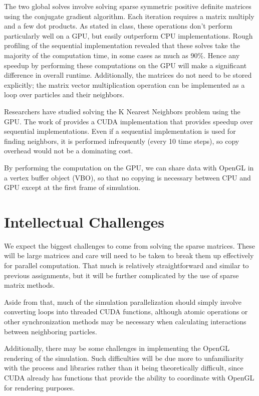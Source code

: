 \documentclass[cameraready]{acmsiggraph-awb}
\begin{document}
The two global solves involve solving sparse symmetric positive definite matrices using the conjugate gradient algorithm.  Each iteration requires a matrix multiply and a few dot products.  As stated in class, these operations don't perform particularly well on a GPU, but easily outperform CPU implementations.  Rough profiling of the sequential implementation revealed that these solves take the majority of the computation time, in some cases as much as 90\%.   Hence any speedup by performing these computations on the GPU will make a significant difference in overall runtime.  Additionally, the matrices do not need to be stored explicitly; the matrix vector multiplication operation can be implemented as a loop over particles and their neighbors.  

Researchers have studied solving the K Nearest Neighbors problem using the GPU.   The work of \cite{Garcia_2008_CVGPU} provides a CUDA implementation that provides speedup over sequential implementations.  Even if a sequential implementation is used for finding neighbors, it is performed infrequently (every 10 time steps), so copy overhead would not be a dominating cost.  

By performing the computation on the GPU, we can share data with OpenGL in a vertex buffer object (VBO), so that no copying is necessary between CPU and GPU except at the first frame of simulation.  


\section{Intellectual Challenges}

We expect the biggest challenges to come from solving the sparse matrices.
These will be large matrices and care will need to be taken to break them up effectively for parallel computation.
That much is relatively straightforward and similar to previous assignments, but it will be further complicated by the use of sparse matrix methods.

Aside from that, much of the simulation parallelization should simply involve converting loops into threaded CUDA functions, 
although atomic operations or other synchronization methods may be necessary when calculating interactions between neighboring particles.

Additionally, there may be some challenges in implementing the OpenGL rendering of the simulation.  
Such difficulties will be due more to unfamiliarity with the process and libraries rather than it being theoretically difficult, 
since CUDA already has functions that provide the ability to coordinate with OpenGL for rendering purposes.
\end{document}
